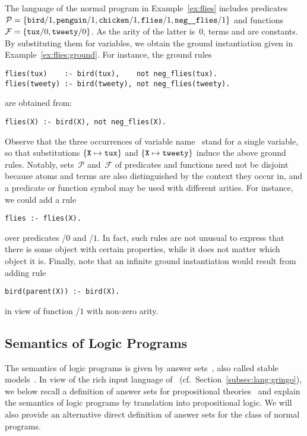 \begin{example}\label{ex:syntax}
The language of the normal program in Example~\ref{ex:flies} includes
predicates
\(
\mathcal{P}=
\{
\texttt{bird}/1,\texttt{penguin}/1,\texttt{chicken}/1,
\texttt{flies}/1,\texttt{neg\_\hspace{-0.7pt}\_flies}/1\}
\)
and functions
\(
\mathcal{F}=
\{
\texttt{tux}/0,\texttt{tweety}/0
\}
\).
As the arity of the latter is~$0$,
terms  and  are constants.
By substituting them for variables,
we obtain the ground instantiation given in Example~\ref{ex:flies:ground}.
For instance, the ground rules
%
\begin{lstlisting}[firstnumber=3]
flies(tux)    :- bird(tux),    not neg_flies(tux).
flies(tweety) :- bird(tweety), not neg_flies(tweety).
\end{lstlisting}
%
are obtained from:
%
\begin{lstlisting}[numbers=none]
flies(X) :- bird(X), not neg_flies(X).
\end{lstlisting}
%
Observe that the three occurrences of variable name~
stand for a single variable, so that substitutions
$\{\texttt{X}\mapsto\texttt{tux}\}$ and $\{\texttt{X}\mapsto\texttt{tweety}\}$
induce the above ground rules.
Notably, sets~$\mathcal{P}$ and~$\mathcal{F}$ of predicates and functions
need not be disjoint because atoms and terms are also distinguished
by the context they occur in,
and a predicate or function symbol may be used with different arities.
For instance, we could add a rule
%
\begin{lstlisting}[numbers=none]
flies :- flies(X).
\end{lstlisting}
%
over predicates /$0$ and /$1$. 
In fact, such rules are not unusual to express that there is some object
with certain properties, while it does not matter which object it is.
Finally, note that an infinite ground instantiation would result from adding rule
\begin{lstlisting}[numbers=none]
bird(parent(X)) :- bird(X).
\end{lstlisting}
in view of function /$1$ with non-zero arity.
\eexample
\end{example}


\subsection{Semantics of Logic Programs}\label{subsec:semantics}

The semantics of logic programs is given by answer sets~\cite{gellif91a},
also called stable models~\cite{gellif88a}.
In view of the rich input language of \gringo\ (cf.\ Section~\ref{subsec:lang:gringo}),
we below recall a definition of answer sets
for propositional theories~\cite{ferraris05a} and
explain the semantics of logic programs by translation
into propositional logic.
We will also provide an alternative direct definition of answer sets
for the class of normal programs.


